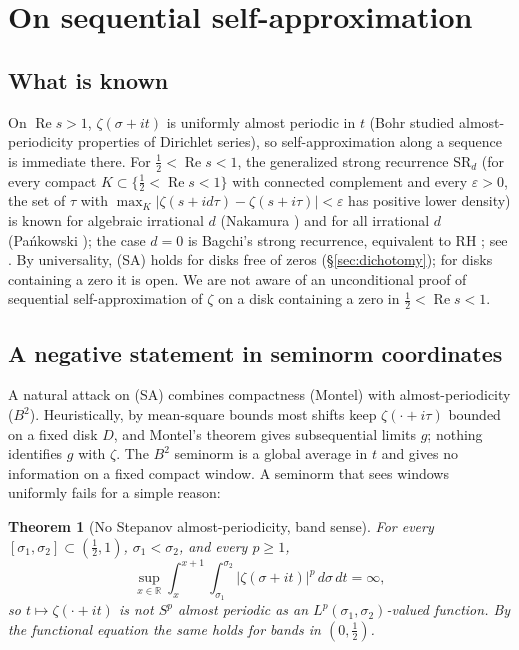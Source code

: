 \documentclass[11pt]{amsart}
\newtheorem{theorem}{Theorem}[section]
\theoremstyle{definition}
\theoremstyle{remark}
\newcommand{\bbR}{\mathbb{R}}
\DeclareMathOperator{\Real}{Re}
\begin{document}
\section{On sequential self-approximation}\label{sec:rigidity}

\subsection{What is known}
On $\Real s>1$, $\zeta(\sigma+it)$ is uniformly almost periodic in $t$
(Bohr \cite{Bohr22} studied almost-periodicity properties of Dirichlet series),
so self-approximation along a sequence is immediate there. For
$\tfrac12<\Real s<1$, the generalized strong recurrence $\mathrm{SR}_d$ (for every compact
$K\subset\{\tfrac12<\Real s<1\}$ with connected complement and every $\varepsilon>0$, the
set of $\tau$ with $\max_K|\zeta(s+id\tau)-\zeta(s+i\tau)|<\varepsilon$ has positive lower
density) is known for algebraic irrational $d$ (Nakamura \cite{Nak09}) and for all
irrational $d$ (Pa\'nkowski \cite{Pan10}); the case $d=0$ is Bagchi's strong
recurrence, equivalent to RH \cite{Bagchi87}; see \cite[\S3, \S5.5]{P27}. By
universality, (SA) holds for disks free of zeros (\S\ref{sec:dichotomy});
for disks containing a zero it is open. We are not aware of an unconditional
proof of sequential self-approximation of $\zeta$ on a disk containing a
zero in $\tfrac12<\Real s<1$.

\subsection{A negative statement in seminorm coordinates}\label{ssec:seminorm}
A natural attack on (SA) combines compactness (Montel) with
almost-periodicity ($B^2$). Heuristically, by mean-square bounds most shifts
keep $\zeta(\cdot+i\tau)$ bounded on a fixed disk $D$, and Montel's theorem
gives subsequential limits $g$; nothing identifies $g$ with $\zeta$. The
$B^2$ seminorm is a global average in $t$ and gives no information on a
fixed compact window. A seminorm that sees windows uniformly fails for a
simple reason:

\begin{theorem}[No Stepanov almost-periodicity, band sense]
\label{thm:stepanov}
For every $[\sigma_1,\sigma_2]\subset(\tfrac12,1)$, $\sigma_1<\sigma_2$, and
every $p\ge1$,
\[
\sup_{x\in\bbR}\int_x^{x+1}\!\!\int_{\sigma_1}^{\sigma_2}|\zeta(\sigma+it)|^p\,
d\sigma\,dt=\infty,
\]
so $t\mapsto\zeta(\cdot+it)$ is not $S^p$ almost periodic as an
$L^p(\sigma_1,\sigma_2)$-valued function. By the functional equation the same
holds for bands in $(0,\tfrac12)$.
\end{theorem}
\end{document}
